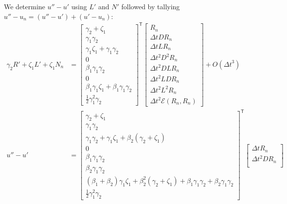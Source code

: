 \documentclass[letterpaper,11pt]{amsart}
\newcommand{\trans}[1]{{#1}^{\ensuremath{\mathsf{T}}}}
\newcommand{\order}[2]{\ensuremath{O\!\left( {#1}^{#2} \right)}}
\begin{document}
We determine $u''-u'$ using $L'$ and $N'$ followed by tallying
$u''-u_{n} = (u''-u')+(u'-u_{n})$:
\begin{align}
      \gamma_{2} R'
    + \zeta_{1}  L'
    + \zeta_{1}  N_{n}
  &=
\trans{\begin{bmatrix}
  \gamma_{2} + \zeta_{1} \\
  \gamma_{1} \gamma_{2} \\
  \gamma_{1} \zeta_{1} + \gamma_{1} \gamma_{2} \\
  0 \\
  \beta_{1} \gamma_{1} \gamma_{2} \\
  0 \\
  \beta_{1} \gamma_{1} \zeta_{1} + \beta_{1} \gamma_{1} \gamma_{2} \\
  \frac{1}{2} \gamma_{1}^{2} \gamma_{2}
\end{bmatrix}}
\begin{bmatrix}
  R_{n} \\
  \Delta{}t D R_{n} \\
  \Delta{}t L R_{n} \\
  \Delta{}t^{2} D^{2} R_{n} \\
  \Delta{}t^{2} D L R_{n} \\
  \Delta{}t^{2} L D R_{n} \\
  \Delta{}t^{2} L^{2} R_{n} \\
  \Delta{}t^{2} \mathcal{E}\left( R_{n}, R_{n} \right)
\end{bmatrix}
  + \order{\Delta{}t}{3}
\\
  u'' - u'
  &=
\trans{\begin{bmatrix}
  \gamma_{2} + \zeta_{1} \\
  \gamma_{1} \gamma_{2} \\
    \gamma_{1} \gamma_{2} + \gamma_{1} \zeta_{1}
  + \beta_{2}\left( \gamma_{2} + \zeta_{1} \right) \\
  0 \\
  \beta_{1} \gamma_{1} \gamma_{2} \\
  \beta_{2} \gamma_{1} \gamma_{2} \\
    \left( \beta_{1} + \beta_{2} \right) \gamma_{1} \zeta_{1}
  + \beta_{2}^{2} \left( \gamma_{2} + \zeta_{1} \right)
  + \beta_{1} \gamma_{1} \gamma_{2}
  + \beta_{2} \gamma_{1} \gamma_{2}
  \\
  \frac{1}{2} \gamma_{1}^{2} \gamma_{2}
\end{bmatrix}}
\begin{bmatrix}
  \Delta{}t R_{n} \\
  \Delta{}t^{2} D R_{n} \\

\end{bmatrix}
\end{align}
\end{document}
